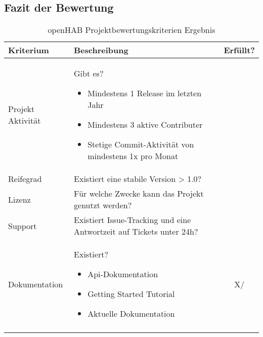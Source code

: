 \subsection{Fazit der Bewertung}
\begin{longtable}{| p{3cm} | p{10cm}| c |}
	\hline
	\textbf{Kriterium} & \textbf{Beschreibung} & \textbf{Erfüllt?} \\
	\hline \hline
	\centering Projekt Aktivität & Gibt es?
	\begin{itemize}
		\item Mindestens 1 Release im letzten Jahr
		\item Mindestens 3 aktive Contributer
		\item Stetige Commit-Aktivität von mindestens 1x pro Monat
	\end{itemize} & \checkmark \\
	\hline
	\centering Reifegrad & Existiert eine stabile Version > 1.0? & \checkmark \\
	\hline
	\centering Lizenz & Für welche Zwecke kann das Projekt genutzt werden? & \checkmark \\
	\hline
	\centering Support & Existiert Issue-Tracking und eine Antwortzeit auf Tickets unter 24h? & \checkmark \\
	\hline
	\centering Dokumentation & Existiert?
	\begin{itemize}
		\item Api-Dokumentation
		\item Getting Started Tutorial
		\item Aktuelle Dokumentation
	\end{itemize} & X/\checkmark \\
	\hline
	\caption{openHAB Projektbewertungskriterien Ergebnis}
	\label{table:openHAB-judgement-criteria-result}
\end{longtable}

